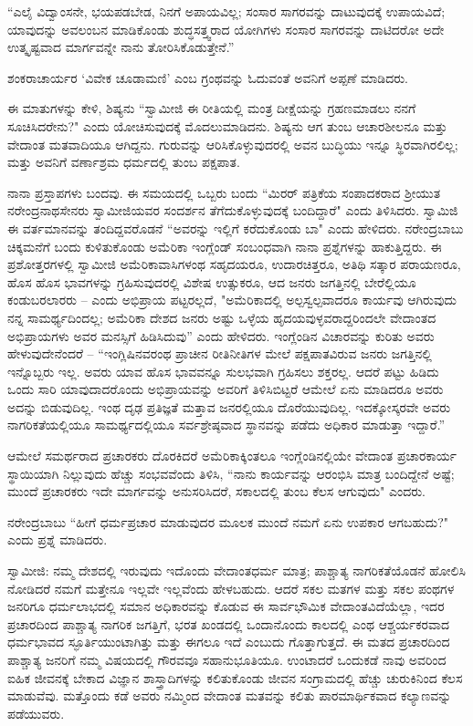 “ಎಲೈ ವಿದ್ವಾಂಸನೇ, ಭಯಪಡಬೇಡ, ನಿನಗೆ ಅಪಾಯವಿಲ್ಲ; ಸಂಸಾರ ಸಾಗರವನ್ನು ದಾಟುವುದಕ್ಕೆ ಉಪಾಯವಿದೆ; ಯಾವುದನ್ನು ಅವಲಂಬನ ಮಾಡಿಕೊಂಡು ಶುದ್ಧಸತ್ತ್ವರಾದ ಯೋಗಿಗಳು ಸಂಸಾರ ಸಾಗರವನ್ನು ದಾಟಿದರೋ ಅದೇ ಉತ್ಕೃಷ್ಟವಾದ ಮಾರ್ಗವನ್ನೇ ನಾನು ತೋರಿಸಿಕೊಡುತ್ತೇನೆ.”

ಶಂಕರಾಚಾರ್ಯರ ‘ವಿವೇಕ ಚೂಡಾಮಣಿ’ ಎಂಬ ಗ್ರಂಥವನ್ನು ಓದುವಂತೆ ಅವನಿಗೆ ಅಪ್ಪಣೆ ಮಾಡಿದರು.

ಈ ಮಾತುಗಳನ್ನು ಕೇಳಿ, ಶಿಷ್ಯನು “ಸ್ವಾಮೀಜಿ ಈ ರೀತಿಯಲ್ಲಿ ಮಂತ್ರ ದೀಕ್ಷೆಯನ್ನು ಗ್ರಹಣಮಾಡಲು ನನಗೆ ಸೂಚಿಸಿದರೇನು?" ಎಂದು ಯೋಚಿಸುವುದಕ್ಕೆ ಮೊದಲುಮಾಡಿದನು. ಶಿಷ್ಯನು ಆಗ ತುಂಬ ಆಚಾರಶೀಲನೂ ಮತ್ತು ವೇದಾಂತ ಮತವಾದಿಯೂ ಆಗಿದ್ದನು. ಗುರುವನ್ನು ಆರಿಸಿಕೊಳ್ಳುವುದರಲ್ಲಿ ಅವನ ಬುದ್ಧಿಯು ಇನ್ನೂ ಸ್ಥಿರವಾಗಿರಲಿಲ್ಲ; ಮತ್ತು ಅವನಿಗೆ ವರ್ಣಾಶ್ರಮ ಧರ್ಮದಲ್ಲಿ ತುಂಬ ಪಕ್ಷಪಾತ.

ನಾನಾ ಪ್ರಸ್ತಾಪಗಳು ಬಂದವು. ಈ ಸಮಯದಲ್ಲಿ ಒಬ್ಬರು ಬಂದು “ಮಿರರ್ ಪತ್ರಿಕೆಯ ಸಂಪಾದಕರಾದ ಶ‍್ರೀಯುತ ನರೇಂದ್ರನಾಥಸೇನರು ಸ್ವಾಮೀಜಿಯವರ ಸಂದರ್ಶನ ತೆಗೆದುಕೊಳ್ಳುವುದಕ್ಕೆ ಬಂದಿದ್ದಾರೆ" ಎಂದು ತಿಳಿಸಿದರು. ಸ್ವಾಮಿಜಿ ಈ ವರ್ತಮಾನವನ್ನು ತಂದಿದ್ದವರೊಡನೆ “ಅವರನ್ನು ಇಲ್ಲಿಗೆ ಕರೆದುಕೊಂಡು ಬಾ" ಎಂದು ಹೇಳಿದರು. ನರೇಂದ್ರಬಾಬು ಚಿಕ್ಕಮನೆಗೆ ಬಂದು ಕುಳಿತುಕೊಂಡು ಅಮೆರಿಕಾ ಇಂಗ್ಲೆಂಡ್ ಸಂಬಂಧವಾಗಿ ನಾನಾ ಪ್ರಶ್ನೆಗಳನ್ನು ಹಾಕುತ್ತಿದ್ದರು. ಈ ಪ್ರಶೋತ್ತರಗಳಲ್ಲಿ ಸ್ವಾಮೀಜಿ ಅಮೆರಿಕಾವಾಸಿಗಳಂಥ ಸಹೃದಯರೂ, ಉದಾರಚಿತ್ತರೂ, ಅತಿಥಿ ಸತ್ಕಾರ ಪರಾಯಣರೂ, ಹೊಸ ಹೊಸ ಭಾವಗಳನ್ನು ಗ್ರಹಿಸುವುದರಲ್ಲಿ ವಿಶೇಷ ಉತ್ಸುಕರೂ, ಆದ ಜನರು ಜಗತ್ತಿನಲ್ಲಿ ಬೇರೆಲ್ಲಿಯೂ ಕಂಡುಬರಲಾರರು – ಎಂದು ಅಭಿಪ್ರಾಯ ಪಟ್ಟರಲ್ಲದೆ, "ಅಮೆರಿಕಾದಲ್ಲಿ ಅಲ್ಪಸ್ವಲ್ಪವಾದರೂ ಕಾರ್ಯವು ಆಗಿರುವುದು ನನ್ನ ಸಾಮರ್ಥ್ಯದಿಂದಲ್ಲ; ಅಮೆರಿಕಾ ದೇಶದ ಜನರು ಅಷ್ಟು ಒಳ್ಳೆಯ ಹೃದಯವುಳ್ಳವರಾದ್ದರಿಂದಲೇ ವೇದಾಂತದ ಅಭಿಪ್ರಾಯಗಳು ಅವರ ಮನಸ್ಸಿಗೆ ಹಿಡಿಸಿದುವು'' ಎಂದು ಹೇಳಿದರು. ಇಂಗ್ಲೆಂಡಿನ ವಿಚಾರವನ್ನು ಕುರಿತು ಅವರು ಹೇಳುವುದೇನೆಂದರೆ – “ಇಂಗ್ಲಿಷಿನವರಂಥ ಪ್ರಾಚೀನ ರೀತಿನೀತಿಗಳ ಮೇಲೆ ಪಕ್ಷಪಾತವಿರುವ ಜನರು ಜಗತ್ತಿನಲ್ಲಿ ಇನ್ನೊಬ್ಬರು ಇಲ್ಲ. ಅವರು ಯಾವ ಹೊಸ ಭಾವವನ್ನೂ ಸುಲಭವಾಗಿ ಗ್ರಹಿಸಲು ಶಕ್ತರಲ್ಲ. ಆದರೆ ಪಟ್ಟು ಹಿಡಿದು ಒಂದು ಸಾರಿ ಯಾವುದಾದರೊಂದು ಅಭಿಪ್ರಾಯವನ್ನು ಅವರಿಗೆ ತಿಳಿಸಿಬಿಟ್ಟರೆ ಆಮೇಲೆ ಏನು ಮಾಡಿದರೂ ಅವರು ಅದನ್ನು ಬಿಡುವುದಿಲ್ಲ. ಇಂಥ ದೃಢ ಪ್ರತಿಜ್ಞತೆ ಮತ್ತಾವ ಜನರಲ್ಲಿಯೂ ದೊರೆಯುವುದಿಲ್ಲ. ಇದಕ್ಕೋಸ್ಕರವೇ ಅವರು ನಾಗರಿಕತೆಯಲ್ಲಿಯೂ ಸಾಮರ್ಥ್ಯದಲ್ಲಿಯೂ ಸರ್ವಶ್ರೇಷ್ಠವಾದ ಸ್ಥಾನವನ್ನು ಪಡೆದು ಅಧಿಕಾರ ಮಾಡುತ್ತಾ ಇದ್ದಾರೆ.”

ಆಮೇಲೆ ಸಮರ್ಥರಾದ ಪ್ರಚಾರಕರು ದೊರಕಿದರೆ ಅಮೆರಿಕಾಕ್ಕಿಂತಲೂ ಇಂಗ್ಲೆಂಡಿನಲ್ಲಿಯೇ ವೇದಾಂತ ಪ್ರಚಾರಕಾರ್ಯ ಸ್ಥಾಯಿಯಾಗಿ ನಿಲ್ಲುವುದು ಹೆಚ್ಚು ಸಂಭವವೆಂದು ತಿಳಿಸಿ, “ನಾನು ಕಾರ್ಯವನ್ನು ಆರಂಭಿಸಿ ಮಾತ್ರ ಬಂದಿದ್ದೇನೆ ಅಷ್ಟೆ; ಮುಂದೆ ಪ್ರಚಾರಕರು ಇದೇ ಮಾರ್ಗವನ್ನು ಅನುಸರಿಸಿದರೆ, ಸಕಾಲದಲ್ಲಿ ತುಂಬ ಕೆಲಸ ಆಗುವುದು" ಎಂದರು.

ನರೇಂದ್ರಬಾಬು “ಹೀಗೆ ಧರ್ಮಪ್ರಚಾರ ಮಾಡುವುದರ ಮೂಲಕ ಮುಂದೆ ನಮಗೆ ಏನು ಉಪಕಾರ ಆಗಬಹುದು?" ಎಂದು ಪ್ರಶ್ನೆ ಮಾಡಿದರು.

ಸ್ವಾಮೀಜಿ: ನಮ್ಮ ದೇಶದಲ್ಲಿ ಇರುವುದು ಇದೊಂದು ವೇದಾಂತಧರ್ಮ ಮಾತ್ರ; ಪಾಶ್ಚಾತ್ಯ ನಾಗರಿಕತೆಯೊಡನೆ ಹೋಲಿಸಿ ನೋಡಿದರೆ ನಮಗೆ ಮತ್ತೇನೂ ಇಲ್ಲವೇ ಇಲ್ಲವೆಂದು ಹೇಳಬಹುದು. ಆದರೆ ಸಕಲ ಮತಗಳ ಮತ್ತು ಸಕಲ ಪಂಥಗಳ ಜನರಿಗೂ ಧರ್ಮಲಾಭದಲ್ಲಿ ಸಮಾನ ಅಧಿಕಾರವನ್ನು ಕೊಡುವ ಈ ಸಾರ್ವಭೌಮಿಕ ವೇದಾಂತವಿದೆಯೆಲ್ಲಾ, ಇದರ ಪ್ರಚಾರದಿಂದ ಪಾಶ್ಚಾತ್ಯ ನಾಗರಿಕ ಜಗತ್ತಿಗೆ, ಭರತ ಖಂಡದಲ್ಲಿ ಒಂದಾನೊಂದು ಕಾಲದಲ್ಲಿ ಎಂಥ ಆಶ್ಚರ್ಯಕರವಾದ ಧರ್ಮಭಾವದ ಸ್ಫೂರ್ತಿಯುಂಟಾಗಿತ್ತು ಮತ್ತು ಈಗಲೂ ಇದೆ ಎಂಬುದು ಗೊತ್ತಾಗುತ್ತದೆ. ಈ ಮತದ ಪ್ರಚಾರದಿಂದ ಪಾಶ್ಚಾತ್ಯ ಜನರಿಗೆ ನಮ್ಮ ವಿಷಯದಲ್ಲಿ ಗೌರವವೂ ಸಹಾನುಭೂತಿಯೂ. ಉಂಟಾದರೆ ಒಂದುಕಡೆ ನಾವು ಅವರಿಂದ ಐಹಿಕ ಜೀವನಕ್ಕೆ ಬೇಕಾದ ವಿಜ್ಞಾನ ಶಾಸ್ತ್ರಾದಿಗಳನ್ನು ಕಲಿತುಕೊಂಡು ಜೀವನ ಸಂಗ್ರಾಮದಲ್ಲಿ ಹೆಚ್ಚು ಚುರುಕಿನಿಂದ ಕೆಲಸ ಮಾಡುವೆವು. ಮತ್ತೊಂದು ಕಡೆ ಅವರು ನಮ್ಮಿಂದ ವೇದಾಂತ ಮತವನ್ನು ಕಲಿತು ಪಾರಮಾರ್ಥಿಕವಾದ ಕಲ್ಯಾಣವನ್ನು ಪಡೆಯುವರು.

